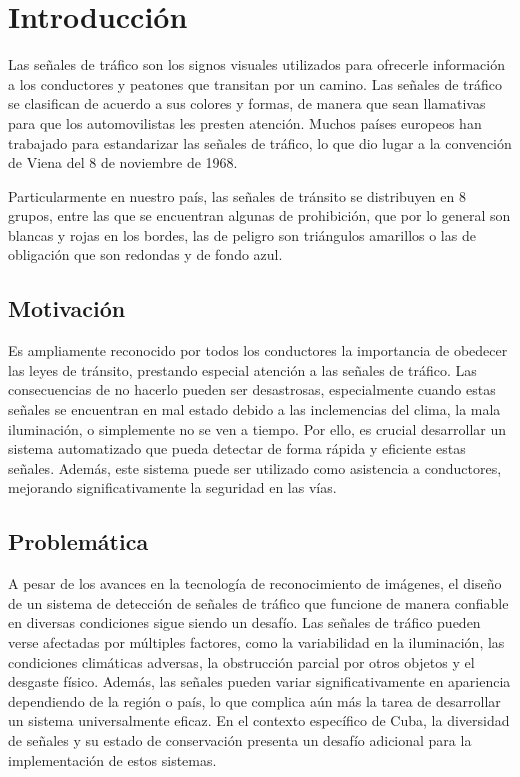 \documentclass{article}
\begin{document}
\section{Introducción}
Las señales de tráfico son los signos visuales utilizados para ofrecerle información a los conductores y peatones que transitan por un camino. Las señales de tráfico se clasifican de acuerdo a sus colores y formas, de manera que sean llamativas para que los automovilistas les presten atención. Muchos países europeos han trabajado para estandarizar las señales de tráfico, lo que dio lugar a la convención de Viena del 8 de noviembre de 1968. 

Particularmente en nuestro país, las señales de tránsito se distribuyen en 8 grupos\cite{ref7}, entre las que se encuentran algunas de prohibición, que por lo general son blancas y rojas en los bordes, las de peligro son triángulos amarillos o las de obligación que son redondas y de fondo azul.
\subsection{Motivación}
Es ampliamente reconocido por todos los conductores la importancia de obedecer las leyes de tránsito, prestando especial atención a las señales de tráfico. Las consecuencias de no hacerlo pueden ser desastrosas, especialmente cuando estas señales se encuentran en mal estado debido a las inclemencias del clima, la mala iluminación, o simplemente no se ven a tiempo. Por ello, es crucial desarrollar un sistema automatizado que pueda detectar de forma rápida y eficiente estas señales. Además, este sistema puede ser utilizado como asistencia a conductores, mejorando significativamente la seguridad en las vías.
\subsection{Problemática}
A pesar de los avances en la tecnología de reconocimiento de imágenes, el diseño de un sistema de detección de señales de tráfico que funcione de manera confiable en diversas condiciones sigue siendo un desafío. Las señales de tráfico pueden verse afectadas por múltiples factores, como la variabilidad en la iluminación, las condiciones climáticas adversas, la obstrucción parcial por otros objetos y el desgaste físico. Además, las señales pueden variar significativamente en apariencia dependiendo de la región o país, lo que complica aún más la tarea de desarrollar un sistema universalmente eficaz. En el contexto específico de Cuba, la diversidad de señales y su estado de conservación presenta un desafío adicional para la implementación de estos sistemas.
\end{document}
